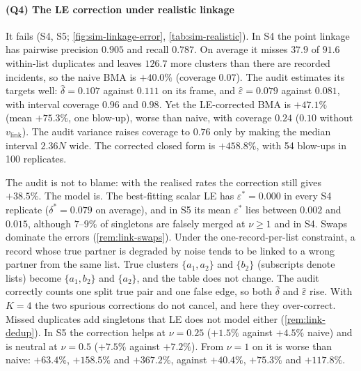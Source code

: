 \paragraph{(Q4) The LE correction under realistic linkage} It fails (S4, S5; \cref{fig:sim-linkage-error}, \cref{tab:sim-realistic}). In S4 the point linkage has pairwise precision $0.905$ and recall $0.787$. On average it misses $37.9$ of $91.6$ within-list duplicates and leaves $126.7$ more clusters than there are recorded incidents, so the naive BMA is $+40.0\%$ (coverage $0.07$). The audit estimates its targets well: $\hat\delta=0.107$ against $0.111$ on its frame, and $\hat\varepsilon=0.079$ against $0.081$, with interval coverage $0.96$ and $0.98$. Yet the LE-corrected BMA is $+47.1\%$ (mean $+75.3\%$, one blow-up), worse than naive, with coverage $0.24$ ($0.10$ without $v_{\mathrm{link}}$). The audit variance raises coverage to $0.76$ only by making the median interval $2.36N$ wide. The corrected closed form is $+458.8\%$, with 54 blow-ups in 100 replicates.

The audit is not to blame: with the realised rates the correction still gives $+38.5\%$. The model is. The best-fitting scalar LE has $\varepsilon^\ast=0.000$ in every S4 replicate ($\delta^\ast=0.079$ on average), and in S5 its mean $\varepsilon^\ast$ lies between $0.002$ and $0.015$, although $7$--$9\%$ of singletons are falsely merged at $\nu\ge1$ and in S4. Swaps dominate the errors (\cref{rem:link-swaps}). Under the one-record-per-list constraint, a record whose true partner is degraded by noise tends to be linked to a wrong partner from the same list. True clusters $\{a_1,a_2\}$ and $\{b_2\}$ (subscripts denote lists) become $\{a_1,b_2\}$ and $\{a_2\}$, and the table does not change. The audit correctly counts one split true pair and one false edge, so both $\hat\delta$ and $\hat\varepsilon$ rise. With $K=4$ the two spurious corrections do not cancel, and here they over-correct. Missed duplicates add singletons that LE does not model either (\cref{rem:link-dedup}). In S5 the correction helps at $\nu=0.25$ ($+1.5\%$ against $+4.5\%$ naive) and is neutral at $\nu=0.5$ ($+7.5\%$ against $+7.2\%$). From $\nu=1$ on it is worse than naive: $+63.4\%$, $+158.5\%$ and $+367.2\%$, against $+40.4\%$, $+75.3\%$ and $+117.8\%$.

